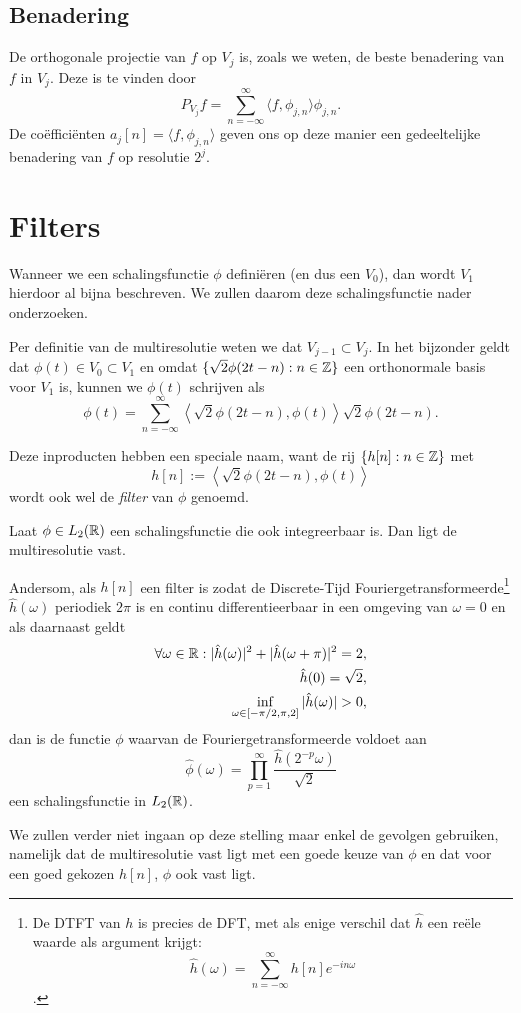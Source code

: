 \subsection{Benadering} De orthogonale projectie van $f$ op $V_j$ is, zoals we weten, de beste benadering van $f$ in $V_j$. 
Deze is te vinden door
\[
P_{V_j} f = \sum_{n=-\infty}^\infty \langle f, \phi_{j,n} \rangle \phi_{j,n}.
\]
De co\"effici\"enten $a_j[n] = \langle f, \phi_{j,n} \rangle$ geven ons op deze manier een gedeeltelijke benadering 
van $f$ op resolutie $2^j$.

\section{Filters}
Wanneer we een schalingsfunctie $\phi$ defini\"eren (en dus een $V_0$), dan wordt $V_1$ hierdoor al bijna beschreven. 
We zullen daarom deze schalingsfunctie nader onderzoeken.

Per definitie van de multiresolutie weten we dat $V_{j-1} \subset V_j$. In het bijzonder geldt dat $\phi(t) \in V_0 \subset V_1$ en omdat $\{ \sqrt{2}\phi(2t - n): n \in \mathbb{Z}\}$ een orthonormale basis voor $V_1$ is, kunnen we $\phi(t)$ schrijven als
\begin{equation}
  \label{phi_t2}
  \phi(t) = \sum_{n=-\infty}^{\infty} \left\langle \sqrt{2} \phi\left(2t-n\right), \phi(t) \right\rangle 
  \sqrt{2}\phi(2t-n).
\end{equation}

\begin{definitie}
  Deze inproducten hebben een speciale naam, want de rij $\{h[n]: n \in \mathbb{Z}\}$ met
  \[
  h[n] := \left\langle \sqrt{2} \phi\left(2t-n\right), \phi(t) \right\rangle
  \]
  wordt ook wel de \emph{filter} van $\phi$ genoemd.
\end{definitie}
\begin{stelling}
  \label{filter}
  Laat $\phi \in L_2(\mathbb{R})$ een schalingsfunctie die ook integreerbaar is. Dan ligt de multiresolutie vast.

  Andersom, als $h[n]$ een filter is zodat de Discrete-Tijd Fouriergetransformeerde\footnote{De DTFT van $h$ is precies de DFT, met als enige verschil dat $\hat h$ een re\"ele waarde als argument krijgt: \[\hat h(\omega) = \sum_{n=-\infty}^\infty h[n] e^{- i n \omega}\].} $\hat{h}(\omega)$ periodiek $2\pi$ is en continu differentieerbaar in een omgeving van $\omega = 0$ en als daarnaast geldt
  \begin{align*}
    \forall \omega \in \mathbb{R}: | \hat{h}(\omega)|^2 + |\hat{h}(\omega + \pi)|^2 = 2, \\
    \hat{h}(0) = \sqrt{2}, \\
    \inf_{\omega \in [-\pi/2, \pi,2]} |\hat{h}(\omega)| > 0,
  \end{align*}
  dan is de functie $\phi$ waarvan de Fouriergetransformeerde voldoet aan
  \[
  \hat{\phi}(\omega) = \prod_{p=1}^\infty \frac{\hat{h}(2^{-p}\omega)}{\sqrt{2}}
  \]
  een schalingsfunctie in $L_2(\mathbb{R})$.
\end{stelling}
We zullen verder niet ingaan op deze stelling maar enkel de gevolgen gebruiken, namelijk dat de multiresolutie vast ligt met een goede keuze van $\phi$ en dat voor een goed gekozen $h[n]$, $\phi$ ook vast ligt.

